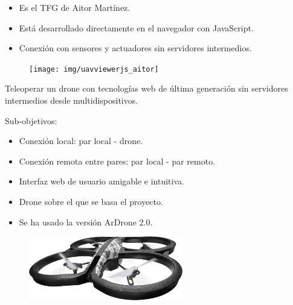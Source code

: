 \documentclass[notes,slidesec,a4]{seminar}
\begin{document}


\begin{hslide}
\begin{itemize}
\item Es el TFG de Aitor Martínez.
\item Está desarrollado directamente en el navegador con JavaScript.
\item Conexión con sensores y actuadores sin servidores intermedios.
\end{itemize}
\begin{center}
\begin{figure}
\texttt{[image: img/uavviewerjs\_aitor]}
\end{figure}
\end{center}
\end{hslide}


\begin{hslide}
Teleoperar un drone con tecnologías web de última generación
sin servidores intermedios desde multidispositivos.

Sub-objetivos:
\begin{itemize}
\item Conexión local: par local - drone.
\item Conexión remota entre pares: par local - par remoto.
\item Interfaz web de usuario amigable e intuitiva.
\end{itemize}
\end{hslide}


\begin{hslide}
\begin{itemize}
\item Drone sobre el que se basa el proyecto.
\item Se ha usado la versión ArDrone 2.0. 
\end{itemize}

\begin{center}
\begin{figure}
\includegraphics[width=0.6\textwidth]{img/ardrone}
\end{figure}
\end{center}
\end{hslide}
\end{document}
